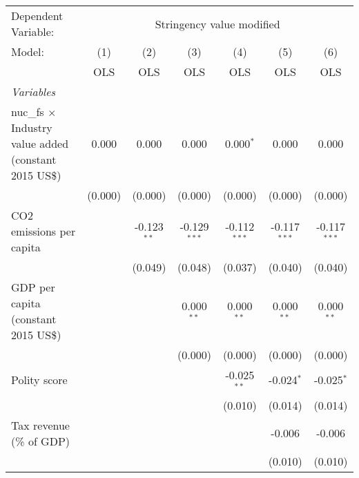 
\begingroup
\centering
\begin{tabular}{lcccccc}
   \toprule
   Dependent Variable: & \multicolumn{6}{c}{Stringency value modified}\\
   Model:                                                        & (1)     & (2)           & (3)            & (4)            & (5)            & (6)\\  
                                                                 &  OLS    & OLS           & OLS            & OLS            & OLS            & OLS\\  
   \midrule
   \emph{Variables}\\
   nuc\_fs $\times$ Industry value added (constant 2015 US\$)    & 0.000   & 0.000         & 0.000          & 0.000$^{*}$    & 0.000          & 0.000\\   
                                                                 & (0.000) & (0.000)       & (0.000)        & (0.000)        & (0.000)        & (0.000)\\   
   CO2 emissions per capita                                      &         & -0.123$^{**}$ & -0.129$^{***}$ & -0.112$^{***}$ & -0.117$^{***}$ & -0.117$^{***}$\\   
                                                                 &         & (0.049)       & (0.048)        & (0.037)        & (0.040)        & (0.040)\\   
   GDP per capita (constant 2015 US\$)                           &         &               & 0.000$^{**}$   & 0.000$^{**}$   & 0.000$^{**}$   & 0.000$^{**}$\\   
                                                                 &         &               & (0.000)        & (0.000)        & (0.000)        & (0.000)\\   
   Polity score                                                  &         &               &                & -0.025$^{**}$  & -0.024$^{*}$   & -0.025$^{*}$\\   
                                                                 &         &               &                & (0.010)        & (0.014)        & (0.014)\\   
   Tax revenue (\% of GDP)                                       &         &               &                &                & -0.006         & -0.006\\   
                                                                 &         &               &                &                & (0.010)        & (0.010)\\   

\end{tabular}
